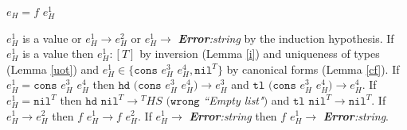 \begin{case}
$e_{H}=f$ $e_{H}^{1}$

$e_{H}^{1}$ is a value or $e_{H}^{1}\rightarrow e_{H}^{2}$ or $e_{H}^{1}\rightarrow$ \emph{\textbf{Error}:\;string} by the induction hypothesis.  If $e_{H}^{1}$ is a value then $e_{H}^{1}:[T]$ by inversion (Lemma \ref{i}) and uniqueness of types (Lemma \ref{uot}) and $e_{H}^{1}\in\lbrace\mathtt{cons}$ $e_{H}^{3}$ $e_{H}^{4},\mathtt{nil}^{T}\rbrace$ by canonical forms (Lemma \ref{cf}).  If $e_{H}^{1}=\mathtt{cons}$ $e_{H}^{3}$ $e_{H}^{4}$ then $\mathtt{hd}$ $(\mathtt{cons}$ $e_{H}^{3}$ $e_{H}^{4})\rightarrow e_{H}^{3}$ and $\mathtt{tl}$ $(\mathtt{cons}$ $e_{H}^{3}$ $e_{H}^{4})\rightarrow e_{H}^{4}$.  If $e_{H}^{1}=\mathtt{nil}^{T}$ then $\mathtt{hd}$ $\mathtt{nil}^{T}\rightarrow{^{T}H}S$ $(\mathtt{wrong}$ \emph{``Empty list"}$)$ and $\mathtt{tl}$ $\mathtt{nil}^{T}\rightarrow\mathtt{nil}^{T}$.  If $e_{H}^{1}\rightarrow e_{H}^{2}$ then $f$ $e_{H}^{1}\rightarrow f$ $e_{H}^{2}$.  If $e_{H}^{1}\rightarrow$ \emph{\textbf{Error}:\;string} then $f$ $e_{H}^{1}\rightarrow$ \emph{\textbf{Error}:\;string}.
\end{case}